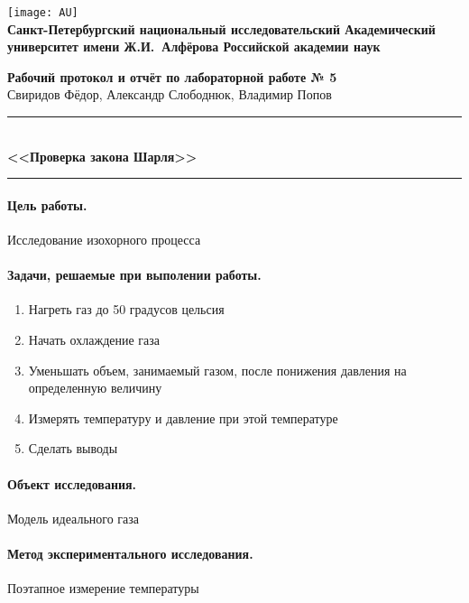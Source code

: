\documentclass{article}
\begin{document}
	\begin{center}
		\texttt{[image: AU]}\\
		{\Large\bfseries Санкт-Петербургский национальный исследовательский Академический университет имени Ж.И.~Алфёрова Российской академии наук}
	\end{center}
	
	\begin{center}
		{\large\textbf{Рабочий протокол и отчёт по лабораторной работе № 5}}\\
		Свиридов Фёдор, Александр Слободнюк, Владимир Попов
	\end{center}
	
	\begin{center}
		\rule{12cm}{0.4mm}\\
		\large\bfseries{<<Проверка закона Шарля>>}\\
		\rule{12cm}{0.4mm}
	\end{center}
	\paragraph{Цель работы.} Исследование изохорного процесса
	\paragraph{Задачи, решаемые при выполении работы.}
	\begin{enumerate}
		\item Нагреть газ до 50 градусов цельсия
		\item Начать охлаждение газа
		\item Уменьшать объем, занимаемый газом, после понижения давления на определенную величину
		\item Измерять температуру и давление при этой температуре
		\item Сделать выводы
	\end{enumerate}
	\paragraph{Объект исследования.} Модель идеального газа
	\paragraph{Метод экспериментального исследования.} Поэтапное измерение температуры
\end{document}
